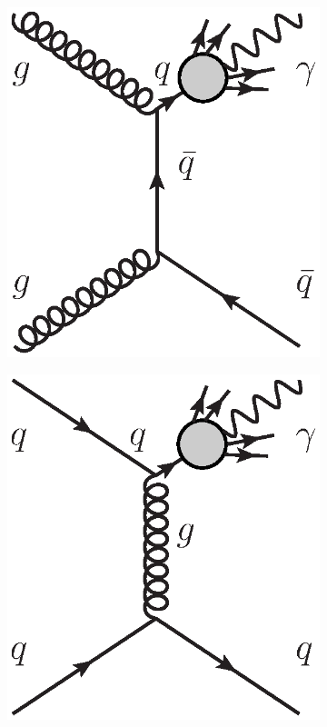 \documentclass[12pt, twoside]{article}
\numberwithin{equation}{section}
\numberwithin{figure}{section}
\begin{document}
\begin{description}
\begin{figure}[h]
\begin{subfigure}[b]{0.25\textwidth}
            \includegraphics[width=\textwidth]{./images/F_LO_Feynman_2.eps}
            \caption{}
            \label{fig:F_LO_Feynman_2}
        \end{subfigure}
        \hspace{1.0cm}
        \begin{subfigure}[b]{0.25\textwidth}
            \includegraphics[width=\textwidth]{./images/F_LO_Feynman_3.eps}

\end{subfigure}
\end{figure}
\end{description}
\end{document}
